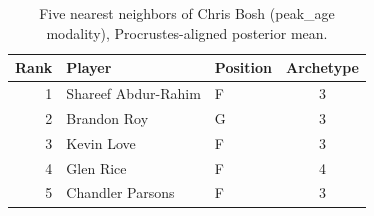 \begin{table}[htbp]
  \centering\small
  \begin{tabular}{rllc}
    \toprule
    Rank & Player & Position & Archetype \\
    \midrule
    1 & Shareef Abdur-Rahim & F & 3 \\
    2 & Brandon Roy & G & 3 \\
    3 & Kevin Love & F & 3 \\
    4 & Glen Rice & F & 4 \\
    5 & Chandler Parsons & F & 3 \\
    \bottomrule
  \end{tabular}
  \caption{Five nearest neighbors of Chris Bosh (peak_age modality), Procrustes-aligned posterior mean.}
  \label{tab:Chris_Bosh_neighbors_peak_age}
\end{table}

